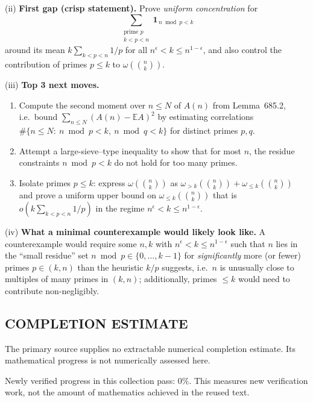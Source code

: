 \smallskip
\noindent(ii) \textbf{First gap (crisp statement).}
Prove \emph{uniform concentration} for
\[
\sum_{\substack{\text{prime }p\\ k<p<n}} \mathbf 1_{\,n\bmod p<k}
\]
around its mean $k\sum_{k<p<n}1/p$ for all $n^\epsilon<k\le n^{1-\epsilon}$, and also control the contribution of primes $p\le k$
to $\omega\!\left(\binom{n}{k}\right)$.

\smallskip
\noindent(iii) \textbf{Top 3 next moves.}
\begin{enumerate}
\item Compute the second moment over $n\le N$ of $A(n)$ from Lemma~685.2, i.e.\ bound
$\sum_{n\le N}(A(n)-\mathbb E A)^2$ by estimating correlations
$\#\{n\le N:\ n\bmod p<k,\ n\bmod q<k\}$ for distinct primes $p,q$.
\item Attempt a large-sieve--type inequality to show that for most $n$, the residue constraints $n\bmod p<k$ do not hold for too many primes.
\item Isolate primes $p\le k$: express $\omega\!\left(\binom{n}{k}\right)$ as
$\omega_{>k}(\binom{n}{k})+\omega_{\le k}(\binom{n}{k})$ and prove a uniform upper bound on $\omega_{\le k}(\binom{n}{k})$
that is $o\!\left(k\sum_{k<p<n}1/p\right)$ in the regime $n^\epsilon<k\le n^{1-\epsilon}$.
\end{enumerate}

\smallskip
\noindent(iv) \textbf{What a minimal counterexample would likely look like.}
A counterexample would require some $n,k$ with $n^\epsilon<k\le n^{1-\epsilon}$ such that $n$ lies in the ``small residue'' set
$n\bmod p\in\{0,\dots,k-1\}$ for \emph{significantly} more (or fewer) primes $p\in(k,n)$ than the heuristic $k/p$ suggests,
i.e.\ $n$ is unusually close to multiples of many primes in $(k,n)$; additionally, primes $\le k$ would need to contribute non-negligibly.




\subsection*{COMPLETION ESTIMATE}
The primary source supplies no extractable numerical completion estimate. Its mathematical progress is not numerically assessed here.

Newly verified progress in this collection pass: $0\%$. This measures new verification work, not the amount of mathematics achieved in the reused text.
